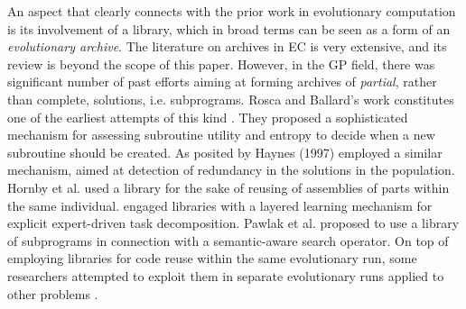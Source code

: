 An aspect that clearly connects \mname with the prior work in evolutionary computation is its involvement of a library, which in broad terms can be seen as a form of an \emph{evolutionary archive}. The literature on archives in EC is very extensive, and its review is beyond the scope of this paper. However, in the GP field, there was significant number of past efforts aiming at forming archives of \emph{partial}, rather than complete, solutions, i.e. subprograms. Rosca and Ballard's work constitutes one of the earliest attempts of this kind \cite{rosca:1996:aigp2}. They proposed a sophisticated mechanism for assessing subroutine utility and entropy to decide when a new subroutine should be created.  As posited by Haynes (1997) employed a similar mechanism, aimed at detection of redundancy in the solutions in the population. Hornby et al. \cite{hornby_alife02_s} used  a library for the sake of reusing of assemblies of parts within the same individual. \cite{bajurnow:2004:llfegsbisp} engaged libraries with a layered learning mechanism for explicit expert-driven task decomposition. Pawlak et al. \cite{Pawlak:2014:ieeeEC} proposed to use a library of subprograms in connection with a semantic-aware search operator. On top of employing libraries for code reuse within the same evolutionary run, some researchers attempted to exploit them in separate evolutionary runs applied to other problems \cite{ryan:2004:GPTP}.